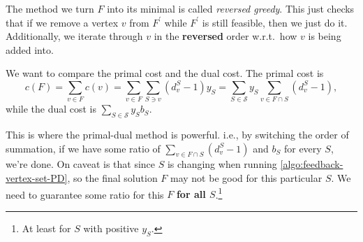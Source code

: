\begin{remark}\label{rmk:reversed-greedy}
	The method we turn \(F\) into its minimal is called \emph{reversed greedy}. This just checks that if we remove a vertex \(v\) from \(F^\prime \) while \(F^\prime \) is still feasible, then we just do it. Additionally, we iterate through \(v\) in the \textbf{reversed} order w.r.t.\ how \(v\) is being added into.
\end{remark}

We want to compare the primal cost and the dual cost. The primal cost is
\[
	c(F) = \sum_{v\in F}c(v) = \sum_{v\in F}\sum_{S\ni v} (d_{v} ^S - 1) y_S = \sum_{S\in \mathcal{S}}y_S \sum_{v\in F \cap S}(d_{v} ^S - 1),
\]
while the dual cost is \(\sum_{S\in \mathcal{S} }y_S b_S\).

\begin{remark}
	This is where the primal-dual method is powerful. i.e., by switching the order of summation, if we have some ratio of \(\sum_{v\in F \cap S}(d_{v} ^S - 1)\) and \(b_S\) for every \(S\), we're done. On caveat is that since \(S\) is changing when running \autoref{algo:feedback-vertex-set-PD}, so the final solution \(F\) may not be good for this particular \(S\). We need to guarantee some ratio for this \(F\) \textbf{for all \(S\)}.\footnote{At least for \(S\) with positive \(y_S\).}
\end{remark}


